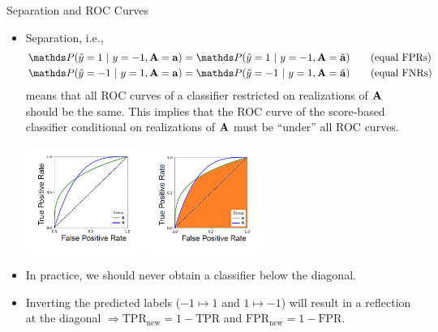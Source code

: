 \begin{vbframe}{Separation and ROC Curves}
	\footnotesize{
		\begin{itemize}
			\item Separation, i.e.,
			\begin{align*}
				&\P(  \yh = 1 ~|~ y = -1, \sens = \ba ) = \P(  \yh = 1 ~|~ y=-1, \sens = \batilde ) \tag{equal FPRs}\\
				&\P(  \yh = -1 ~|~ y = 1, \sens = \ba ) = \P(  \yh = -1 ~|~ y=1, \sens = \batilde ) \tag{equal FNRs}
			\end{align*}
			means that all ROC curves of a classifier restricted on realizations of $\mathbf{A}$ should be the same.
			This implies that the ROC curve of the score-based classifier conditional on realizations of $\mathbf{A}$ must be
			``under'' all ROC curves.   
			
			\begin{center}
%				
				\includegraphics[width=0.3\textwidth]{figure/roc_curve_groups.png}
				\includegraphics[width=0.3\textwidth]{figure/roc_curve_groups_area.png}
%				
			\end{center}
			
			\item In practice, we should never obtain a classifier below the diagonal.
%			
			\item Inverting the predicted labels ($-1 \mapsto 1$ and $1 \mapsto -1$) will 
			result in a reflection at the diagonal  $\Rightarrow \text{TPR}_{\text{new}} = 1 - \text{TPR}$ and 
			$\text{FPR}_{\text{new}} = 1 - \text{FPR}.$ \\	
		\end{itemize}
	}
\end{vbframe}

